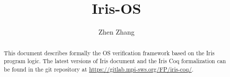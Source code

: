 \documentclass[10pt]{article}
\title{\bfseries Iris-OS}
\author{Zhen Zhang}
\begin{document}
\maketitle
\thispagestyle{empty}
\vfill
\begin{abstract}
This document describes formally the OS verification framework based on the Iris program logic.
The latest versions of Iris document and the Iris Coq formalization can be found in the git repository at \url{https://gitlab.mpi-sws.org/FP/iris-coq/}.
\end{abstract}

\clearpage
\tableofcontents
\clearpage

\begingroup

\endgroup
\clearpage

\begingroup

\endgroup
\clearpage

\begingroup

\endgroup
\clearpage

\begingroup

\endgroup
\clearpage

\begingroup

\endgroup
\clearpage

\printbibliography
\end{document}
